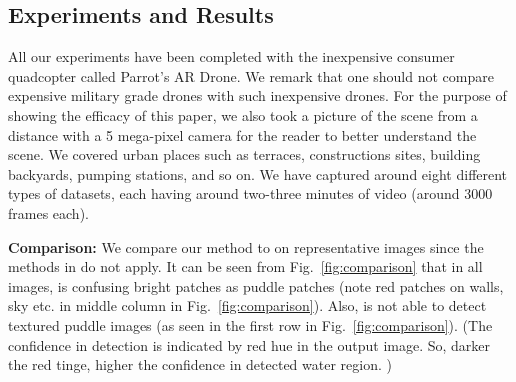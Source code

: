 \documentclass[11pt]{article}
\begin{document}
\subsection{Experiments and Results}

All our experiments have been completed with the inexpensive consumer
quadcopter called Parrot's AR Drone. We remark that one should not
compare expensive military grade drones with such inexpensive drones.
For the purpose of showing the efficacy of this paper, we also took a
picture of the scene from a distance with a 5 mega-pixel camera for
the reader to better understand the scene.  We covered urban places
such as terraces, constructions sites, building backyards,
pumping stations, and so on.  We have captured around eight different
types of datasets, each having around two-three minutes of video
(around 3000 frames each). 

\textbf{Comparison:} We compare our method to \cite{rankin2004daytime} on
representative images since the methods in \cite{rankin11} do not apply. 
It can be seen
from Fig.~\ref{fig:comparison} that in all images, \cite{rankin2004daytime} is
confusing  bright patches as puddle patches (note red patches on walls, sky etc.
in middle column in Fig.~\ref{fig:comparison}). Also, \cite{rankin2004daytime}
is not able to detect textured puddle images (as seen in the first row in
Fig.~\ref{fig:comparison}). (The confidence in detection is indicated by red
hue in the output image. So, darker the red tinge, higher the confidence in
detected water region. )
\end{document}
